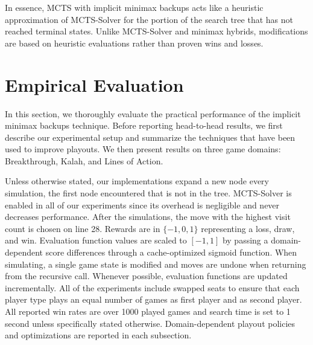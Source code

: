 \documentclass{article}
\begin{document}
In essence, MCTS with implicit minimax backups acts like a heuristic approximation of MCTS-Solver for the portion of the
search tree that has not reached terminal states. 
Unlike MCTS-Solver and minimax hybrids, modifications are based on heuristic evaluations rather than 
proven wins and losses.


\section{Empirical Evaluation}

\newcommand{\UCTMAXH}{$\mbox{UCTMAX}_H$\xspace}
\newcommand{\UCTH}{$\mbox{UCT}_H$\xspace}

In this section, we thoroughly evaluate the practical performance of the implicit minimax backups technique. 
Before reporting head-to-head results, we first describe our experimental setup and 
summarize the techniques that have been used to improve playouts. We then present results on three game
domains: Breakthrough, Kalah, and Lines of Action. 

Unless otherwise stated, our implementations expand a new node every simulation, the first node encountered
that is not in the tree. MCTS-Solver is enabled in all of our experiments since its overhead is negligible and
never decreases performance. After the simulations, the move with the highest visit count 
is chosen on line 28. 
Rewards are in $\{-1, 0, 1\}$ representing a loss, draw, and win.
Evaluation function values are scaled to $[-1,1]$ by passing a domain-dependent 
score differences through a cache-optimized sigmoid function. 
When simulating, a single game state is modified and 
moves are undone when returning from the recursive call.
Whenever possible, evaluation functions are updated incrementally. 
All of the experiments include swapped seats to ensure that each player type plays 
an equal number of games as first player and as second player.
All reported win rates are over 1000 played games and search time is set to 1 second unless specifically stated 
otherwise.
Domain-dependent playout policies and optimizations are reported in each subsection.
\end{document}
